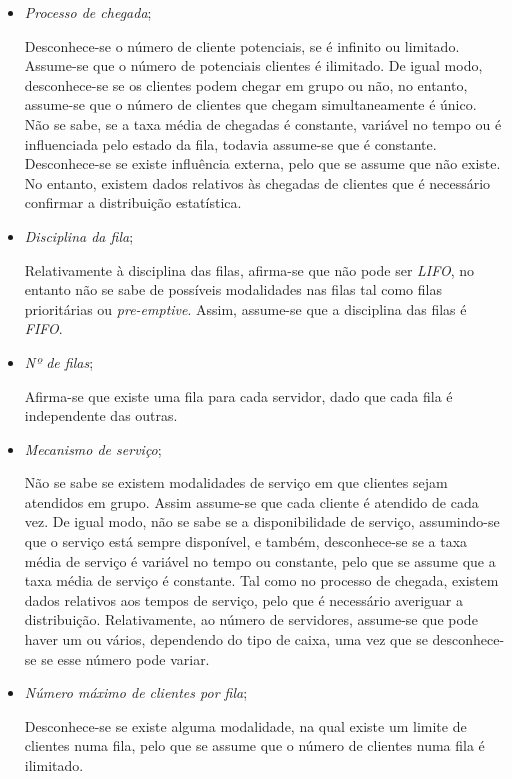 \begin{itemize}

	\item \emph{Processo de chegada};

Desconhece-se o número de cliente potenciais, se é infinito ou limitado.
Assume-se que o número de potenciais clientes é ilimitado. De igual modo,
desconhece-se se os clientes podem chegar em grupo ou não, no entanto, assume-se
que o número de clientes que chegam simultaneamente é único. Não se sabe, se
a taxa média de chegadas é constante, variável no tempo ou é influenciada pelo
estado da fila, todavia assume-se que é constante. Desconhece-se se existe
influência externa, pelo que se assume que não existe. No entanto, existem dados
relativos às chegadas de clientes que é necessário confirmar a distribuição
estatística.
	
	\item \emph{Disciplina da fila};

Relativamente à disciplina das filas, afirma-se que não pode ser
\emph{LIFO}, no entanto não se sabe de possíveis modalidades nas filas tal
como filas prioritárias ou \emph{pre-emptive}. Assim, assume-se que
a disciplina das filas é \emph{FIFO}.   

	\item \emph{Nº de filas};

Afirma-se que existe uma fila para cada servidor, dado que cada fila
é independente das outras. 

	\item \emph{Mecanismo de serviço};

Não se sabe se existem modalidades de serviço em que clientes sejam atendidos
em grupo. Assim assume-se que cada cliente é atendido de cada vez. De igual
modo, não se sabe se a disponibilidade de serviço, assumindo-se que o serviço
está sempre disponível, e também, desconhece-se se a taxa média de serviço
é variável no tempo ou constante, pelo que se assume que a taxa média de serviço
é constante. Tal como no processo de chegada, existem dados relativos aos tempos
de serviço, pelo que é necessário averiguar a distribuição. Relativamente, ao
número de servidores, assume-se que pode haver um ou vários, dependendo do tipo
de caixa, uma vez que se desconhece-se se esse número pode variar.

	\item \emph{Número máximo de clientes por fila};

Desconhece-se se existe alguma modalidade, na qual existe um limite de clientes
numa fila, pelo que se assume que o número de clientes numa fila é ilimitado.

\end{itemize}

